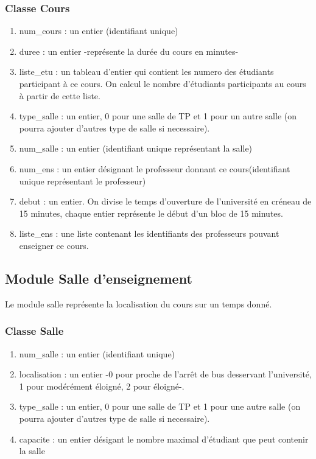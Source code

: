 \documentclass[a4paper,11pt]{article}
\begin{document}
		\subsubsection{Classe Cours}
		\begin{enumerate}
			\item num\_cours :  un entier (identifiant unique)
			\item duree : un entier -représente la durée du cours en minutes-
			\item liste\_etu : un tableau d'entier qui contient les numero des étudiants participant à ce cours. On calcul le nombre d'étudiants participants au cours à partir de cette liste.
			\item type\_salle : un entier, 0 pour une salle de TP et 1 pour un autre salle (on pourra ajouter d'autres type de salle si necessaire).
			\item num\_salle : un entier (identifiant unique représentant la salle)
			\item num\_ens : un entier désignant le professeur donnant ce cours(identifiant unique représentant le professeur)
			\item debut : un entier. On divise le temps d'ouverture de l'université en créneau de 15 minutes, chaque entier représente le début d'un bloc de 15 minutes. 
			\item liste\_ens : une liste contenant les identifiants des professeurs pouvant enseigner ce cours.
		\end{enumerate}
	\subsection{Module Salle d'enseignement}
		Le module salle représente la localisation du cours sur un temps donné.
		\subsubsection{Classe Salle}
		\begin{enumerate}
			\item num\_salle : un entier (identifiant unique)
			\item localisation : un entier -0 pour proche de l'arrêt de bus desservant l'université, 1 pour modérément éloigné, 2 pour éloigné-. 
			\item type\_salle : un entier, 0 pour une salle de TP et 1 pour une autre salle (on pourra ajouter d'autres type de salle si necessaire).
			\item capacite : un entier désigant le nombre maximal d'étudiant que peut contenir la salle	
		\end{enumerate}
\end{document}
